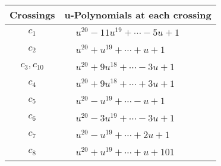 \documentclass[1p]{elsarticle_modified}
\theoremstyle{definition}
\begin{document}
\begin{tabular}{m{50pt}|m{274pt}}
Crossings & \hspace{64pt}u-Polynomials at each crossing \\
\hline $$\begin{aligned}c_{1}\end{aligned}$$&$\begin{aligned}
&u^{20}-11 u^{19}+\cdots-5 u+1
\end{aligned}$\\
\hline $$\begin{aligned}c_{2}\end{aligned}$$&$\begin{aligned}
&u^{20}+u^{19}+\cdots+u+1
\end{aligned}$\\
\hline $$\begin{aligned}c_{3},c_{10}\end{aligned}$$&$\begin{aligned}
&u^{20}+9 u^{18}+\cdots-3 u+1
\end{aligned}$\\
\hline $$\begin{aligned}c_{4}\end{aligned}$$&$\begin{aligned}
&u^{20}+9 u^{18}+\cdots+3 u+1
\end{aligned}$\\
\hline $$\begin{aligned}c_{5}\end{aligned}$$&$\begin{aligned}
&u^{20}- u^{19}+\cdots- u+1
\end{aligned}$\\
\hline $$\begin{aligned}c_{6}\end{aligned}$$&$\begin{aligned}
&u^{20}-3 u^{19}+\cdots-3 u+1
\end{aligned}$\\
\hline $$\begin{aligned}c_{7}\end{aligned}$$&$\begin{aligned}
&u^{20}- u^{19}+\cdots+2 u+1
\end{aligned}$\\
\hline $$\begin{aligned}c_{8}\end{aligned}$$&$\begin{aligned}
&u^{20}+u^{19}+\cdots+u+101
\end{aligned}$\\

\end{tabular}
\end{document}
